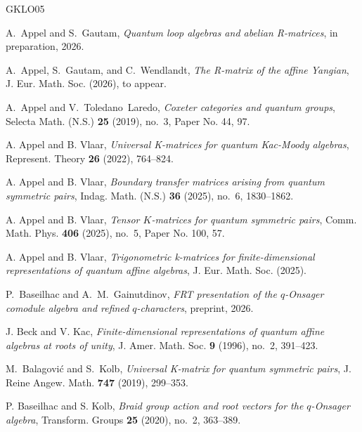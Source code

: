 \documentclass[reqno]{amsart}
\newcommand{\nc}{\newcommand}
\numberwithin{equation}{section}
\begin{document}

\nc{\etalchar}[1]{$^{#1}$}

\begin{thebibliography}{GKLO05}

A.~Appel and S.~Gautam, \emph{Quantum loop algebras and abelian
	{R}-matrices}, in preparation, 2026.

A.~Appel, S.~Gautam, and C.~Wendlandt, \emph{The {R}-matrix of the affine
	{Y}angian}, J. Eur. Math. Soc. (2026), to appear.

A.~Appel and V.~Toledano~Laredo, \emph{Coxeter categories and quantum groups},
Selecta Math. (N.S.) \textbf{25} (2019), no.~3, Paper No. 44, 97.

A. Appel and B. Vlaar, \emph{Universal {K}-matrices for quantum
	{K}ac-{M}oody algebras}, Represent. Theory \textbf{26} (2022), 764--824.

A. Appel and B. Vlaar, \emph{Boundary transfer matrices arising from quantum symmetric
	pairs}, Indag. Math. (N.S.) \textbf{36} (2025), no.~6, 1830--1862.

A. Appel and B. Vlaar, \emph{Tensor {$K$}-matrices for quantum symmetric pairs}, Comm. Math.
Phys. \textbf{406} (2025), no.~5, Paper No. 100, 57. 

A. Appel and B. Vlaar, \emph{Trigonometric k-matrices for finite-dimensional 
representations of quantum affine algebras}, J. Eur. Math. Soc. (2025).

P.~Baseilhac and A.~M.~Gainutdinov,
\emph{{FRT} presentation of the {$q$}-{O}nsager comodule algebra and refined
	{$q$}-characters}, preprint, 2026.

J. Beck and V. Kac, \emph{Finite-dimensional representations of
	quantum affine algebras at roots of unity}, J. Amer. Math. Soc. \textbf{9}
(1996), no.~2, 391--423. 

M.~Balagovi\'{c} and S.~Kolb, \emph{Universal {K}-matrix for quantum symmetric
	pairs}, J. Reine Angew. Math. \textbf{747} (2019), 299--353. 

P. Baseilhac and S. Kolb, \emph{Braid group action and root vectors for
	the {$q$}-{O}nsager algebra}, Transform. Groups \textbf{25} (2020), no.~2,
363--389. 


\end{thebibliography}
\end{document}
